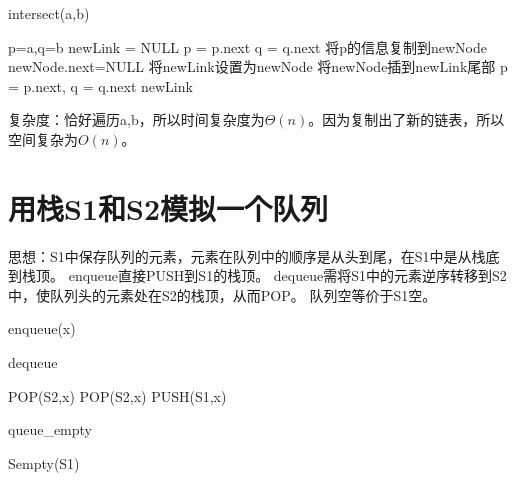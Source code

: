 \documentclass[UTF8]{ctexart}
\begin{document}
\begin{algorithm}
\caption{intersect(a,b)}
\begin{algorithmic}
	\STATE p=a,q=b
	\STATE newLink = NULL
			\STATE p = p.next
		\ENDWHILE
			\STATE q = q.next
		\ENDWHILE
			\STATE 将p的信息复制到newNode
			\STATE newNode.next=NULL
				\STATE 将newLink设置为newNode
			\ELSE
				\STATE 将newNode插到newLink尾部
			\ENDIF
			\STATE p = p.next, q = q.next
		\ENDIF
	\ENDWHILE
	\RETURN newLink
\end{algorithmic}
\end{algorithm}

复杂度：恰好遍历a,b，所以时间复杂度为$\varTheta(n)$。因为复制出了新的链表，所以空间复杂为$O(n)$。

\section{用栈S1和S2模拟一个队列}%
思想：S1中保存队列的元素，元素在队列中的顺序是从头到尾，在S1中是从栈底到栈顶。
enqueue直接PUSH到S1的栈顶。
dequeue需将S1中的元素逆序转移到S2中，使队列头的元素处在S2的栈顶，从而POP。
队列空等价于S1空。

\begin{algorithm}
\caption{enqueue(x)}
\begin{algorithmic}
\end{algorithmic}
\end{algorithm}

\begin{algorithm}
\caption{dequeue}
\begin{algorithmic}
\ENDWHILE
{}
\STATE POP(S2,x)
	\STATE POP(S2,x)
	\STATE PUSH(S1,x)
\ENDWHILE
{}
\end{algorithmic}
\end{algorithm}

\begin{algorithm}
\caption{queue\_empty}
\begin{algorithmic}
\RETURN Sempty(S1)
\end{algorithmic}
\end{algorithm}
\end{document}
